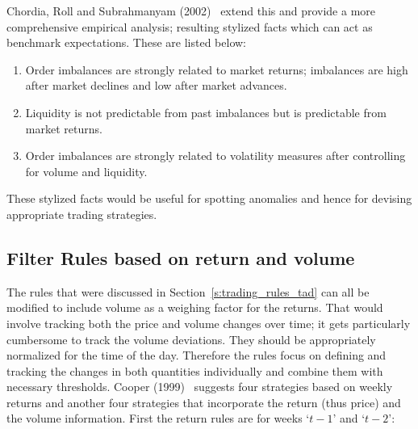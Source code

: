 Chordia, Roll and Subrahmanyam (2002)~\cite{chorroll} extend this and provide a more comprehensive empirical analysis; resulting stylized facts which can act as benchmark expectations. These are listed below:
	\begin{enumerate}[--]
	\item Order imbalances are strongly related to market returns; imbalances are high after market declines and low after market advances.
	\item Liquidity is not predictable from past imbalances but is predictable from market returns.
	\item Order imbalances are strongly related to volatility measures after controlling for volume and liquidity. 
	\end{enumerate}
These stylized facts would be useful for spotting anomalies and hence for devising appropriate trading strategies. 


\subsection{Filter Rules based on return and volume}

The rules that were discussed in Section~\ref{s:trading_rules_tad} can all be modified to include volume as a weighing factor for the returns. That would involve tracking both the price and volume changes over time; it gets particularly cumbersome to track the volume deviations. They should be appropriately normalized for the time of the day. Therefore the rules focus on defining and tracking the changes in both quantities individually and combine them with necessary thresholds. Cooper (1999)~\cite{cooper} suggests four strategies based on weekly returns and another four strategies that incorporate the return (thus price) and the volume information. First the return rules are for weeks `$t-1$' and `$t-2$': 

